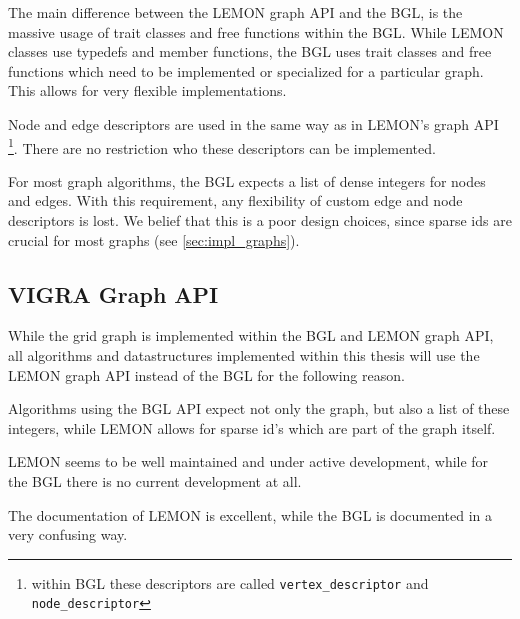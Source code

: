The main difference between the LEMON graph API and the BGL,
is the massive usage of trait classes and free functions within the BGL.
While LEMON classes use typedefs and member functions, 
the BGL uses trait classes and free functions which need 
to be implemented or specialized for a particular graph.
This allows for very flexible implementations.

Node and edge descriptors are used in the same way as in LEMON's
graph API \footnote{within BGL these descriptors are called \lstinline{vertex_descriptor} and 
\lstinline{node_descriptor}}.
There are no restriction who these descriptors can be implemented.

For most graph algorithms, the BGL expects a list of dense integers for
nodes and edges.
With this requirement, any flexibility of custom edge and node descriptors is lost.
We belief that this is a poor design choices, since sparse ids
are crucial for most graphs (see \cref{sec:impl_graphs}).




\subsection{VIGRA Graph API}

While the grid graph is implemented within the BGL and LEMON graph API,
all algorithms and datastructures implemented within this thesis will
use the LEMON graph API instead of the BGL 
for the following reason.
\begin{inparaenum}[(i)]
\item Algorithms using the BGL API expect not only the graph, but also 
a list of these integers, while LEMON allows for sparse id's which 
are part of the graph itself.
\item LEMON seems to be well maintained and under active development,
while for the BGL there is no current development at all.
\item The documentation of LEMON is excellent, while the BGL is
documented in a very confusing way.
  
\end{inparaenum}

